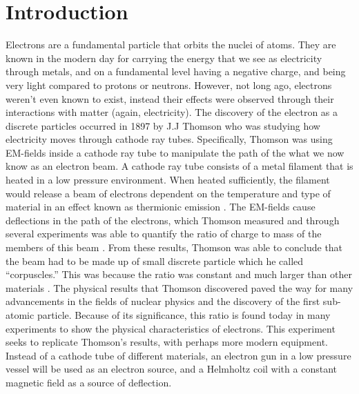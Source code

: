 \documentclass[rc]{physicsinprogress}
\begin{document}
\maketitle

\section{Introduction}

Electrons are a fundamental particle that orbits the nuclei of atoms. They are known in the modern day for carrying the energy that we see as electricity through metals, and on a  fundamental level having a negative charge, and being very light compared to protons or neutrons. However, not long ago, electrons weren't even known to exist, instead their effects were observed through their interactions with matter (again, electricity). The discovery of the electron as a discrete particles occurred in 1897 by J.J Thomson who was studying how electricity moves through cathode ray tubes\cite{Chodos_2000}. Specifically, Thomson was using EM-fields inside a cathode ray tube to manipulate the path of the what we now know as an electron beam. A cathode ray tube consists of a metal filament that is heated in a low pressure environment. When heated sufficiently, the filament would release a beam of electrons dependent on the temperature and type of material in an effect known as thermionic emission \cite{goel2026thermionic}.
The EM-fields cause deflections in the path of the electrons, which Thomson measured and through several experiments was able to quantify the ratio of charge to mass of the members of this beam \cite{Thomson01022010}. From these results, Thomson was able to conclude that the beam had to be made up of small discrete particle which he called ``corpuscles.'' This was because the ratio was constant and much larger than other materials \cite{Thomson01022010}. The physical results that Thomson discovered paved the way for many advancements in the fields of nuclear physics and the discovery of the first sub-atomic particle. Because of its significance, this ratio is found today in many experiments to show the physical characteristics of electrons. This experiment seeks to replicate Thomson's results, with perhaps more modern equipment. Instead of a cathode tube of different materials, an electron gun in a low pressure vessel will be used as an electron source, and a Helmholtz coil with a constant magnetic field as a source of deflection.
\end{document}
